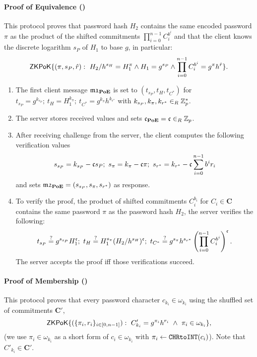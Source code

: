 \paragraph{Proof of Equivalence (\PoE)}
This protocol proves that password hash $H_2$ contains the same encoded password $\pi$ as the product of the shifted commitments $\prod_{i=0}^{n-1} C^{b^i}_i$ and that the client knows the discrete logarithm $s_P$ of $H_1$ to base $g$, in particular:
\[
  \mathsf{ZKPoK}\{(\pi,s_P,\hat{r}) : ~ H_2/h^{s_H}=H_1^{\pi} \wedge H_1 = g^{s_P} \wedge \prod_{i=0}^{n-1} C_i^{b^i} = g^{\pi}h^{\hat{r}}\}.
\]
\begin{enumerate}
  \item The first client message $\mathfrak{m1}_\mathsf{\bf PoE}$ is set to $(t_{s_P}, t_H, t_{C^\ast})$ for
    $t_{s_P}=g^{k_{s_P}};~ t_H=H_1^{k_{\pi}};~ t_{C^\ast}=g^{k_{\pi}}h^{k_{r^{\ast}}}$
    with 
    $k_{s_P},k_{\pi},k_{r^\ast}\in_R\mathbb{Z}^\ast_p$.
    
  \item The server stores received values and sets $\mathfrak{c}_\mathsf{\bf PoE}=\mathfrak{c}\in_R\mathbb{Z}_p$. 
  
  \item After receiving challenge \Client from the server, the client computes the following verification values
    \[
      s_{s_P}=k_{s_P}-\mathfrak{c} s_P;~ s_{\pi}=k_\pi - \mathfrak{c} \pi;~ s_{r^\ast}=k_{r^\ast} - \mathfrak{c} \sum_{i=0}^{n-1} b^i r_i
    \]
    and sets $\mathfrak{m2}_\mathsf{\bf PoE}=(s_{s_P}, s_\pi, s_{r^\ast})$ as response.
  
  \item To verify the proof, \ie the product of shifted commitments $C_i^{b_i}$ for $C_i\in\bm C$ contains the same password $\pi$ as the password hash $H_2$, the server verifies the following:
    \[
      t_{s_P}\stackrel{?}{=} g^{s_{s_P}}H_1^{\mathfrak{c}};~ t_H\stackrel{?}{=} H_1^{s_\pi}(H_2/h^{s_H})^\mathfrak{c};~
      t_{C^\ast}\stackrel{?}{=} g^{s_\pi}h^{s_{r^\ast}} \left(\prod_{i=0}^{n-1} C^{b^i}_i \right)^\mathfrak{c}.
    \]
    The server accepts the proof iff those verifications succeed.
\end{enumerate}


\paragraph{Proof of Membership (\PoM)} \label{sec:bpr:pom}
This protocol proves that every password character $c_{k_i}\in\omega_{k_i}$ using the shuffled set of commitments $\bm C'$, \ie
\[\mathsf{ZKPoK}\{(\{\pi_i,r_i\}_{i\in[0,n-1]}) : ~ C'_{{k_i}}=g^{\pi_{i}}h^{r_{i}} ~ \wedge ~ \pi_{i}\in \omega_{{k_i}}\},\]
(we use $\pi_{i}\in \omega_{{k_i}}$ as a short form of $c_i\in\omega_{{k_i}}$ with $\pi_i\gets \texttt{CHRtoINT}(c_i)$).
Note that $C'_{k_i}\in \bm C'$.


